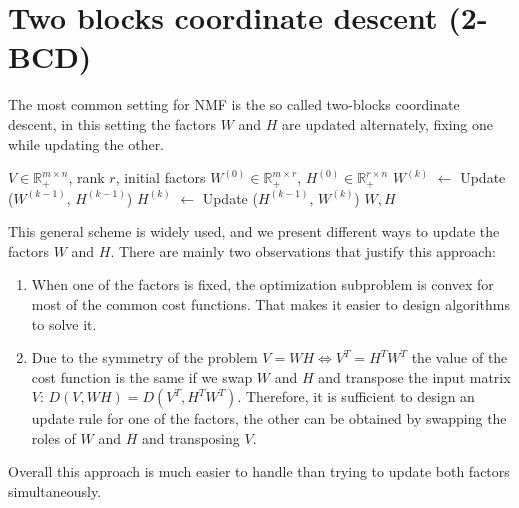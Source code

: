 \section{Two blocks coordinate descent (2-BCD)} \label{2-BCD general framework}
The most common setting for NMF is the so called two-blocks coordinate descent, in this setting the factors \( W \) and \( H \) are updated alternately, fixing one while updating the other.
\begin{algorithm}
    \caption{Two-blocks coordinate descent for NMF}
    \label{2-BCD}
    \begin{algorithmic}[1]
        \Require \( V \in \mathbb{R}_+^{m \times n} \), rank \( r \), initial factors \( W^{(0)} \in \mathbb{R}_+^{m \times r} \), \( H^{(0)} \in \mathbb{R}_+^{r \times n} \)
            \State \(W^{(k)}\) $\gets$ Update (\( W^{(k - 1)} \), \( H^{(k-1)} \))
            \State \(H^{(k)}\) $\gets$ Update (\( H^{(k - 1)} \), \( W^{(k)} \))
        \EndWhile
        \State \Return \( W, H \)
    \end{algorithmic}
\end{algorithm}
This general scheme is widely used, and we present different ways to update the factors \( W \) and \( H \). There are mainly two observations that justify this approach:
\begin{enumerate}
    \item When one of the factors is fixed, the optimization subproblem is convex for most of the common cost functions. That makes it easier to design algorithms to solve it.
    \item Due to the symmetry of the problem $V = WH \iff V^T = H^T W^T$ the value of the cost function is the same if we swap \( W \) and \( H \) and transpose the input matrix \( V \): $D(V, WH) = D(V^T, H^T W^T)$.
    Therefore, it is sufficient to design an update rule for one of the factors, the other can be obtained by swapping the roles of \( W \) and \( H \) and transposing \( V \).
\end{enumerate}
Overall this approach is much easier to handle than trying to update both factors simultaneously. %
